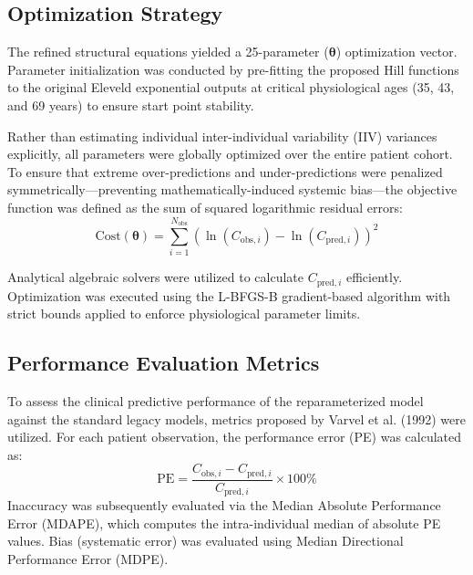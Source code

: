 \documentclass[12pt,a4paper]{article}
\begin{document}
\subsection{Optimization Strategy}
The refined structural equations yielded a 25-parameter ($\boldsymbol{\theta}$) optimization vector. Parameter initialization was conducted by pre-fitting the proposed Hill functions to the original Eleveld exponential outputs at critical physiological ages (35, 43, and 69 years) to ensure start point stability. 

Rather than estimating individual inter-individual variability (IIV) variances explicitly, all parameters were globally optimized over the entire patient cohort. To ensure that extreme over-predictions and under-predictions were penalized symmetrically—preventing mathematically-induced systemic bias—the objective function was defined as the sum of squared logarithmic residual errors:
\begin{equation}
    \text{Cost}(\boldsymbol{\theta}) = \sum_{i=1}^{N_{\text{obs}}} \left( \ln(C_{\text{obs}, i}) - \ln(C_{\text{pred}, i}) \right)^2
\end{equation}

Analytical algebraic solvers were utilized to calculate $C_{\text{pred},i}$ efficiently. Optimization was executed using the L-BFGS-B gradient-based algorithm with strict bounds applied to enforce physiological parameter limits.

\subsection{Performance Evaluation Metrics}
To assess the clinical predictive performance of the reparameterized model against the standard legacy models, metrics proposed by Varvel et al. (1992) were utilized. For each patient observation, the performance error (PE) was calculated as:
\begin{equation}
    \text{PE} = \frac{C_{\text{obs}, i} - C_{\text{pred}, i}}{C_{\text{pred}, i}} \times 100\%
\end{equation}
Inaccuracy was subsequently evaluated via the Median Absolute Performance Error (MDAPE), which computes the intra-individual median of absolute PE values. Bias (systematic error) was evaluated using Median Directional Performance Error (MDPE). 
\end{document}
